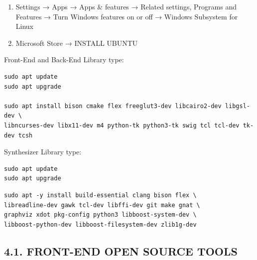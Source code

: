 \documentclass[
]{article}
\begin{document}
\begin{enumerate}
\def\labelenumi{\arabic{enumi}.}
\item
  Settings → Apps → Apps \& features → Related settings, Programs and
  Features → Turn Windows features on or off → Windows Subsystem for
  Linux
\item
  Microsoft Store → INSTALL UBUNTU
\end{enumerate}

Front-End and Back-End Library type:

\begin{verbatim}
sudo apt update
sudo apt upgrade

sudo apt install bison cmake flex freeglut3-dev libcairo2-dev libgsl-dev \
libncurses-dev libx11-dev m4 python-tk python3-tk swig tcl tcl-dev tk-dev tcsh
\end{verbatim}

Synthesizer Library type:

\begin{verbatim}
sudo apt update
sudo apt upgrade
\end{verbatim}

\begin{verbatim}
sudo apt -y install build-essential clang bison flex \
libreadline-dev gawk tcl-dev libffi-dev git make gnat \
graphviz xdot pkg-config python3 libboost-system-dev \
libboost-python-dev libboost-filesystem-dev zlib1g-dev
\end{verbatim}

\hypertarget{front-end-open-source-tools-2}{%
\subsection{4.1. FRONT-END OPEN SOURCE
TOOLS}\label{front-end-open-source-tools-2}}
\end{document}
